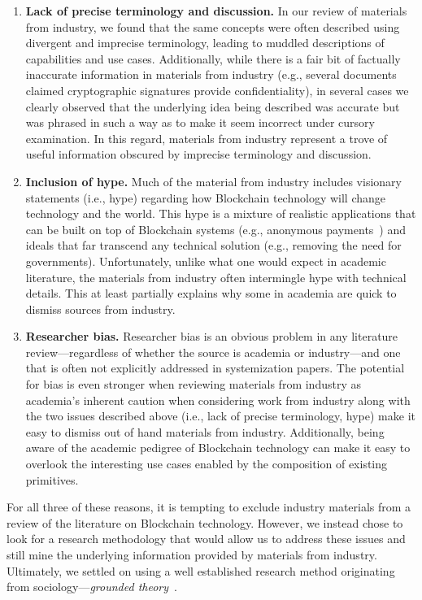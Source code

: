 \begin{enumerate}
	\item \textbf{Lack of precise terminology and discussion.}
	In our review of materials from industry, we found that the same concepts were often described using divergent and imprecise terminology, leading to muddled descriptions of capabilities and use cases.
	Additionally, while there is a fair bit of factually inaccurate information in materials from industry (e.g., several documents claimed cryptographic signatures provide confidentiality), in several cases we clearly observed that the underlying idea being described was accurate but was phrased in such a way as to make it seem incorrect under cursory examination.
	In this regard, materials from industry represent a trove of useful information obscured by imprecise terminology and discussion.
	
	\item \textbf{Inclusion of hype.}
	Much of the material from industry includes visionary statements (i.e., hype) regarding how Blockchain technology will change technology and the world.
	This hype is a mixture of realistic applications that can be built on top of Blockchain systems (e.g., anonymous payments~\cite{tbd}) and ideals that far transcend any technical solution (e.g., removing the need for governments).
	Unfortunately, unlike what one would expect in academic literature, the materials from industry often intermingle hype with technical details. This at least partially explains why some in academia are quick to dismiss sources from industry.
	
	\item \textbf{Researcher bias.}	
	Researcher bias is an obvious problem in any literature review---regardless of whether the source is academia or industry---and one that is often not explicitly addressed in systemization papers.
	The potential for bias is even stronger when reviewing materials from industry as academia's inherent caution when considering work from industry along with the two issues described above (i.e., lack of precise terminology, hype) make it easy to dismiss out of hand materials from industry.
	Additionally, being aware of the academic pedigree of Blockchain technology can make it easy to overlook the interesting use cases enabled by the composition of existing primitives.
	
\end{enumerate}

For all three of these reasons, it is tempting to exclude industry materials from a review of the literature on Blockchain technology. However, we instead chose to look for a research methodology that would allow us to address these issues and still mine the underlying information provided by materials from industry.
Ultimately, we settled on using a well established research method originating from sociology---\emph{grounded theory}~\cite{groundedTheory}.


